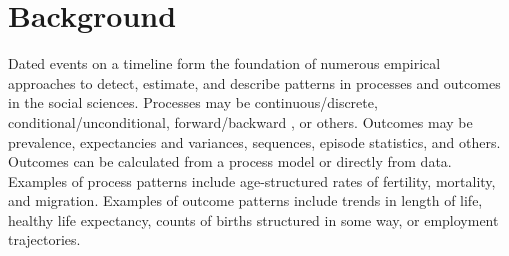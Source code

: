 \documentclass{bmcart}
\begin{document}
\begin{frontmatter}
\begin{abstractbox}

\begin{keyword}
\end{keyword}


\end{abstractbox}
%

\end{frontmatter}



\section*{Background}

Dated events on a timeline form the foundation of numerous empirical approaches to detect, estimate, and describe patterns in processes and outcomes in the social sciences. Processes may be continuous/discrete, conditional/unconditional, forward/backward \citep{brouard2019backward}, or others. Outcomes may be prevalence, expectancies and variances, sequences, episode statistics, and others. Outcomes can be calculated from a process model or directly from data. Examples of process patterns include age-structured rates of fertility, mortality, and migration. Examples of outcome patterns include trends in length of life, healthy life expectancy, counts of births structured in some way, or employment trajectories. 
\end{document}

